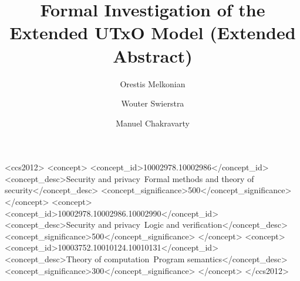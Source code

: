 \documentclass[sigplan,review,screen]{acmart}\settopmatter{printfolios=true,printccs=false,printacmref=false}
\begin{document}
\sloppy %

\title{Formal Investigation of the Extended UTxO Model (Extended Abstract)}

\author{Orestis Melkonian}

\author{Wouter Swierstra}

\author{Manuel Chakravarty}


\begin{CCSXML}
<ccs2012>
<concept>
<concept_id>10002978.10002986</concept_id>
<concept_desc>Security and privacy~Formal methods and theory of security</concept_desc>
<concept_significance>500</concept_significance>
</concept>
<concept>
<concept_id>10002978.10002986.10002990</concept_id>
<concept_desc>Security and privacy~Logic and verification</concept_desc>
<concept_significance>500</concept_significance>
</concept>
<concept>
<concept_id>10003752.10010124.10010131</concept_id>
<concept_desc>Theory of computation~Program semantics</concept_desc>
<concept_significance>300</concept_significance>
</concept>
</ccs2012>
\end{CCSXML}


\end{document}
